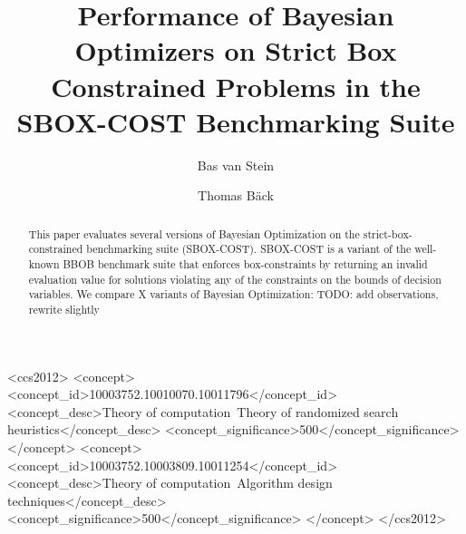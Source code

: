 \documentclass[sigconf=true, nonacm=false, review=true, anonymous = false,screen=true]{acmart}
\begin{document}
\title[Performance of Bayesian Optimizers on Strict Box Constrained Problems]{Performance of Bayesian Optimizers on Strict Box Constrained Problems in the SBOX-COST Benchmarking Suite} %

\author{Bas van Stein}

\author{Thomas B{\"a}ck}


\begin{abstract}
This paper evaluates several versions of Bayesian Optimization on the strict-box-constrained benchmarking suite (SBOX-COST). 
SBOX-COST is a variant of the well-known BBOB benchmark suite that enforces box-constraints by returning an invalid evaluation value for solutions violating any of the constraints on the bounds of decision variables. 
We compare X variants of Bayesian Optimization: 
TODO: add observations, rewrite slightly
\end{abstract}


\begin{CCSXML}
<ccs2012>
   <concept>
       <concept_id>10003752.10010070.10011796</concept_id>
       <concept_desc>Theory of computation~Theory of randomized search heuristics</concept_desc>
       <concept_significance>500</concept_significance>
       </concept>
   <concept>
       <concept_id>10003752.10003809.10011254</concept_id>
       <concept_desc>Theory of computation~Algorithm design techniques</concept_desc>
       <concept_significance>500</concept_significance>
       </concept>
 </ccs2012>
\end{CCSXML}
\end{document}
